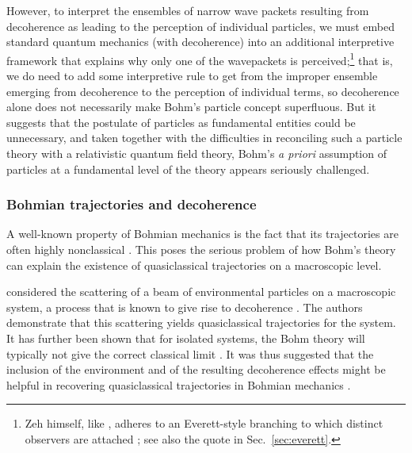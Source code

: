 \documentclass[twocolumn,rmp,aps,amsmath,amsfonts,noshowkeys,noshowpacs]{revtex4}
\begin{document}
However, to interpret the ensembles of narrow wave packets resulting
from decoherence as leading to the perception of individual particles,
we must embed standard quantum mechanics (with decoherence) into an
additional interpretive framework that explains why only one of the
wavepackets is perceived;\footnote{Zeh himself, like
  \citet{Zurek:1998:re}, adheres to an Everett-style branching to
  which distinct observers are attached \citep{Zeh:1993:lt}; see also
  the quote in Sec.~\ref{sec:everett}.}  that is, we do need to add
some interpretive rule to get from the improper ensemble emerging from
decoherence to the perception of individual terms, so decoherence
alone does not necessarily make Bohm's particle concept superfluous.
But it suggests that the postulate of particles as fundamental
entities could be unnecessary, and taken together with the
difficulties in reconciling such a particle theory with a relativistic
quantum field theory, Bohm's \emph{a priori} assumption of particles
at a fundamental level of the theory appears seriously challenged.


\subsubsection{Bohmian trajectories and decoherence}
 
A well-known property of Bohmian mechanics is the fact that its
trajectories are often highly nonclassical \citep[see, for
example,][]{Bohm:1993:ll,Holland:1993:fc,Appleby:1999:uy}.  This poses
the serious problem of how Bohm's theory can explain the existence of
quasiclassical trajectories on a macroscopic level.

\citet{Bohm:1993:ll} considered the scattering of a beam of
environmental particles on a macroscopic system, a process that is
known to give rise to decoherence \citep{Joos:1985:iu,Joos:2003:jh}.
The authors demonstrate that this scattering yields quasiclassical
trajectories for the system. It has further been shown that for
isolated systems, the Bohm theory will typically not give the correct
classical limit \citep{Appleby:1999:uy}.  It was thus suggested that
the inclusion of the environment and of the resulting decoherence
effects might be helpful in recovering quasiclassical trajectories in
Bohmian mechanics
\citep{Appleby:1999:zs,Zeh:1999:rr,Allori:2001:po,Allori:2001:tc,Allori:2001:vl,Sanz:2003:za}.
\end{document}
